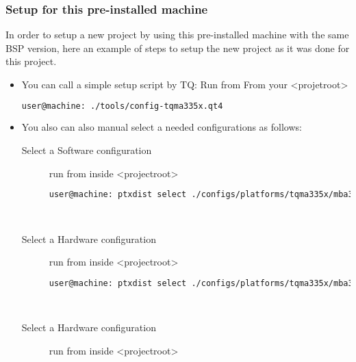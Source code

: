 \subsubsection{Setup for this pre-installed machine }%
In order to setup a new project by using this pre-installed machine with the
same BSP version, here an example of steps to setup the new project as it was
done for this project.

\begin{itemize}
    \item You can call a simple setup script by TQ:\@
        Run from From your <projetroot>\footnotemark[1]
        \begin{lstlisting}[language=bash, gobble=12,caption={Run TQ-Systems
        enviroment setup script}]
                user@machine: ./tools/config-tqma335x.qt4
        \end{lstlisting}

    \item You also can also manual select a needed configurations as follows:

        \begin{description}
            \item[Select a Software configuration] run from inside
                <projectroot>~\footnotemark[1]

                \begin{lstlisting}[language=bash,gobble=12, caption={Select the
                ptxdist configuraion file},keywordstyle=\color{black}]
            user@machine: ptxdist select ./configs/platforms/tqma335x/mba335x/platformconfig
                \end{lstlisting}~\cite[Selecting a Userland
                Configuration]{ptxdist_manual}

            \item[Select a Hardware configuration] run from inside
                <projectroot>~\footnotemark[1]

                \begin{lstlisting}[language=bash,gobble=12, caption={Select the
                ptxdist configuraion file},keywordstyle=\color{black}]
            user@machine: ptxdist select ./configs/platforms/tqma335x/mba335x/platformconfig
                \end{lstlisting}~\cite[Selecting a Userland
                Configuration]{ptxdist_manual}

            \item[Select a Hardware configuration] run from inside
                <projectroot>~\footnotemark[1]


\end{description}
\end{itemize}

